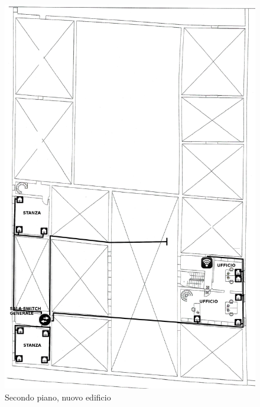 \documentclass[11pt, a4paper, oneside]{article}
\begin{document}
			\begin{figure}[H]
				\caption{Secondo piano, nuovo edificio}
				\includegraphics[scale=0.2]{architecture-007.png}
			\end{figure}
		
		\newpage
\end{document}
